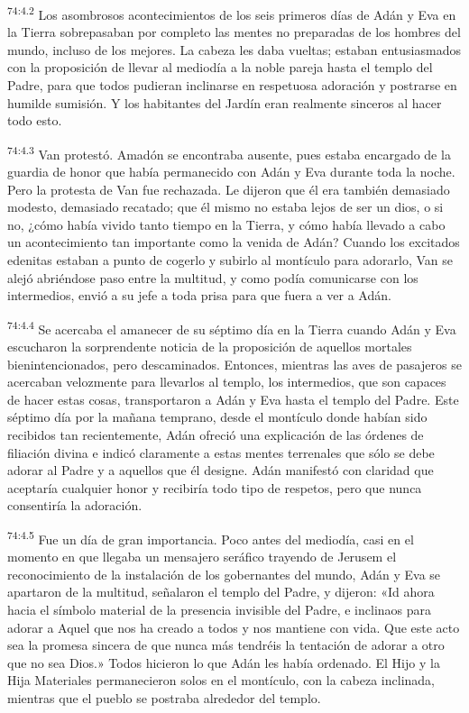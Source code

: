 \par
\textsuperscript{74:4.2} Los asombrosos acontecimientos de los seis primeros días de Adán y Eva en la Tierra sobrepasaban por completo las mentes no preparadas de los hombres del mundo, incluso de los mejores. La cabeza les daba vueltas; estaban entusiasmados con la proposición de llevar al mediodía a la noble pareja hasta el templo del Padre, para que todos pudieran inclinarse en respetuosa adoración y postrarse en humilde sumisión. Y los habitantes del Jardín eran realmente sinceros al hacer todo esto.

\par
\textsuperscript{74:4.3} Van protestó. Amadón se encontraba ausente, pues estaba encargado de la guardia de honor que había permanecido con Adán y Eva durante toda la noche. Pero la protesta de Van fue rechazada. Le dijeron que él era también demasiado modesto, demasiado recatado; que él mismo no estaba lejos de ser un dios, o si no, ¿cómo había vivido tanto tiempo en la Tierra, y cómo había llevado a cabo un acontecimiento tan importante como la venida de Adán? Cuando los excitados edenitas estaban a punto de cogerlo y subirlo al montículo para adorarlo, Van se alejó abriéndose paso entre la multitud, y como podía comunicarse con los intermedios, envió a su jefe a toda prisa para que fuera a ver a Adán.

\par
\textsuperscript{74:4.4} Se acercaba el amanecer de su séptimo día en la Tierra cuando Adán y Eva escucharon la sorprendente noticia de la proposición de aquellos mortales bienintencionados, pero descaminados. Entonces, mientras las aves de pasajeros se acercaban velozmente para llevarlos al templo, los intermedios, que son capaces de hacer estas cosas, transportaron a Adán y Eva hasta el templo del Padre. Este séptimo día por la mañana temprano, desde el montículo donde habían sido recibidos tan recientemente, Adán ofreció una explicación de las órdenes de filiación divina e indicó claramente a estas mentes terrenales que sólo se debe adorar al Padre y a aquellos que él designe. Adán manifestó con claridad que aceptaría cualquier honor y recibiría todo tipo de respetos, pero que nunca consentiría la adoración.

\par
\textsuperscript{74:4.5} Fue un día de gran importancia. Poco antes del mediodía, casi en el momento en que llegaba un mensajero seráfico trayendo de Jerusem el reconocimiento de la instalación de los gobernantes del mundo, Adán y Eva se apartaron de la multitud, señalaron el templo del Padre, y dijeron: «Id ahora hacia el símbolo material de la presencia invisible del Padre, e inclinaos para adorar a Aquel que nos ha creado a todos y nos mantiene con vida. Que este acto sea la promesa sincera de que nunca más tendréis la tentación de adorar a otro que no sea Dios.» Todos hicieron lo que Adán les había ordenado. El Hijo y la Hija Materiales permanecieron solos en el montículo, con la cabeza inclinada, mientras que el pueblo se postraba alrededor del templo.


